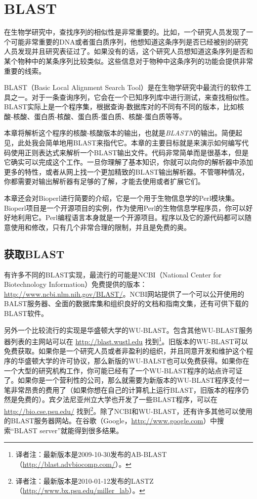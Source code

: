 \chapter{BLAST}
\label{chap:chapter12}
\minitoc

在生物学研究中，查找序列的相似性是非常重要的。比如，一个研究人员发现了一个可能非常重要的DNA或者蛋白质序列，他想知道这条序列是否已经被别的研究人员发现并且研究表征过了。如果没有的话，这个研究人员想知道这条序列是否和某个物种中的某条序列比较类似。这些信息对于物种中这条序列的功能会提供非常重要的线索。

BLAST（Basic Local Alignment Search Tool）是在生物学研究中最流行的软件工具之一。对于一条查询序列，它会在一个已知序列库中进行测试，来查找相似性。BLAST实际上是一个程序集，根据查询-数据库对的不同有不同的版本，比如核酸-核酸、蛋白质-核酸、蛋白质-蛋白质、核酸-蛋白质等等。

本章将解析这个程序的核酸-核酸版本的输出，也就是\textit{BLASTN}的输出。简便起见，此处我会简单地用BLAST来指代它。本章的主要目标就是来演示如何编写代码使用正则表达式来解析一个BLAST输出文件。代码非常简单而是很基本，但是它确实可以完成这个工作。一旦你理解了基本知识，你就可以向你的解析器中添加更多的特性，或者从网上找一个更加精致的BLAST输出解析器。不管哪种情况，你都需要对输出解析器有足够的了解，才能去使用或者扩展它们。

本章还会对Bioperl进行简要的介绍，它是一个用于生物信息学的Perl模块集。Bioperl项目是一个开源项目的实例，作为使用Perl的生物信息学程序员，你可以好好地利用它。Perl编程语言本身就是一个开源项目。程序以及它的源代码都可以随意使用和修改，只有几个非常合理的限制，并且是免费的奥。

\section{获取BLAST}
有许多不同的BLAST实现，最流行的可能是NCBI（National Center for Biotechnology Information）免费提供的版本：\href{http://www.ncbi.nlm.nih.gov/BLAST/}{http://www.ncbi.nlm.nih.gov/BLAST/}。NCBI网站提供了一个可以公开使用的BALST服务器、全面的数据库集和组织良好的文档和指南文集，还有可供下载的BLAST软件。

另外一个比较流行的实现是华盛顿大学的WU-BLAST。包含其他WU-BLAST服务器列表的主网站可以在 \href{http://blast.wustl.edu}{http://blast.wustl.edu} 找到\footnote{译者注：最新版本是2009-10-30发布的AB-BLAST（\href{http://blast.advbiocomp.com/}{http://blast.advbiocomp.com/}）。}。旧版本的WU-BLAST可以免费获取。如果你是一个研究人员或者非盈利的组织，并且同意开发和维护这个程序的华盛顿大学的许可协议，那么新版的WU-BALST也可以免费获得。如果你在一个大型的研究机构工作，你可能已经有了一个WU-BLAST程序的站点许可证了。如果你是一个营利性的公司，那么就需要为新版本的WU-BLAST程序支付一笔非常昂贵的费用了（如果你想在自己的计算机上运行BLAST，旧版本的程序仍然是免费的）。宾夕法尼亚州立大学也开发了一些BLAST程序，可以在 \href{http://bio.cse.psu.edu/}{http://bio.cse.psu.edu/} 找到\footnote{译者注：最新版本是2010-01-12发布的LASTZ（\href{http://www.bx.psu.edu/miller\_lab}{http://www.bx.psu.edu/miller\_lab}）。}。除了NCBI和WU-BLAST，还有许多其他可以使用的BLAST服务器网站。在谷歌（Google，\href{http://www.google.com}{http://www.google.com}）中搜索“BLAST server”就能得到很多结果。

